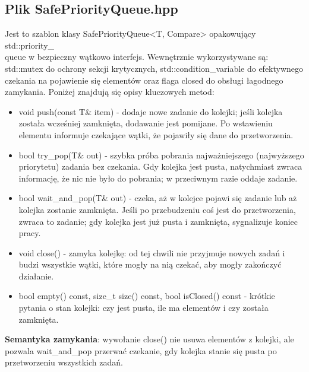 \documentclass[a4paper,12pt]{article}
\begin{document}
        \subsection{Plik SafePriorityQueue.hpp}
            \vspace{-0.2em}
            Jest to szablon klasy SafePriorityQueue<T, Compare> opakowujący std::priority\_\\queue w bezpieczny wątkowo interfejs. Wewnętrznie wykorzystywane są: std::mutex do ochrony sekcji krytycznych, std::condition\_variable do efektywnego czekania na pojawienie się elementów oraz flaga closed do obsługi łagodnego zamykania. Poniżej znajdują się opisy kluczowych metod:
            \begin{itemize}
                \item void push(const T\& item) - dodaje nowe zadanie do kolejki; jeśli kolejka została wcześniej zamknięta, dodawanie jest pomijane. Po wstawieniu elementu informuje czekające wątki, że pojawiły się dane do przetworzenia.
                \item bool try\_pop(T\& out) - szybka próba pobrania najważniejszego (najwyższego priorytetu) zadania bez czekania. Gdy kolejka jest pusta, natychmiast zwraca informację, że nic nie było do pobrania; w przeciwnym razie oddaje zadanie.
                \item bool wait\_and\_pop(T\& out) - czeka, aż w kolejce pojawi się zadanie lub aż kolejka zostanie zamknięta. Jeśli po przebudzeniu coś jest do przetworzenia, zwraca to zadanie; gdy kolejka jest już pusta i zamknięta, sygnalizuje koniec pracy.
                \item void close() - zamyka kolejkę: od tej chwili nie przyjmuje nowych zadań i budzi wszystkie wątki, które mogły na nią czekać, aby mogły zakończyć działanie.
                \item bool empty() const, size\_t size() const, bool isClosed() const - krótkie pytania o stan kolejki: czy jest pusta, ile ma elementów i czy została zamknięta.
            \end{itemize}
            \textbf{Semantyka zamykania}: wywołanie close() nie usuwa elementów z kolejki, ale pozwala wait\_and\_pop przerwać czekanie, gdy kolejka stanie się pusta po przetworzeniu wszystkich zadań.
        \newpage
        \vspace*{2em}
\end{document}
